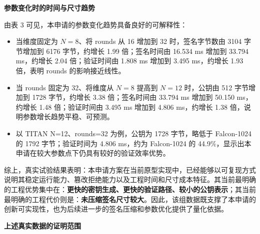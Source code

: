 \documentclass[12pt,a4paper]{article}
\begin{document}
\textbf{参数变化时的时间与尺寸趋势}

\begin{table}[htbp]
    \centering
    \small
    \caption{TITAN 参数扩展下的真实测量结果}
\end{table}

由表 3 可见，本申请的参数变化趋势具备良好的可解释性：
\begin{itemize}
    \item 当维度固定为 $N=8$、将 rounds 从 16 增加到 32 时，签名字节数由 3104 字节增加到 6176 字节，约增长 1.99 倍；签名时间由 16.534 ms 增加到 33.794 ms，约增长 2.04 倍；验证时间由 1.808 ms 增加到 3.495 ms，约增长 1.93 倍，表明 rounds 的影响接近线性。
    \item 当 rounds 固定为 32、将维度从 $N=8$ 提高到 $N=12$ 时，公钥由 512 字节增加到 1728 字节，约增长 3.38 倍；签名时间由 33.794 ms 增加到 50.150 ms，约增长 1.48 倍；验证时间由 3.495 ms 增加到 4.806 ms，约增长 1.38 倍，说明参数增长趋势平稳、可预测。
    \item 以 TITAN N=12、rounds=32 为例，公钥为 1728 字节，略低于 Falcon-1024 的 1792 字节；验证时间为 4.806 ms，约为 Falcon-1024 的 44.9\%，显示出本申请在较大参数点下仍具有较好的验证效率优势。
\end{itemize}

综上，真实试验结果表明：本申请方案在当前原型实现中，已经能够以可复现方式说明其稳定运行能力、篡改拒绝能力以及工程时间和尺寸成本特征。其当前最明确的工程优势集中在：\textbf{更快的密钥生成、更快的验证路径、较小的公钥表示}；其当前最明确的工程代价则是：\textbf{未压缩签名尺寸较大}。因此，该组数据既支撑了本申请的创新可实现性，也为后续进一步的签名压缩和参数优化提供了量化依据。

\textbf{上述真实数据的证明范围}
\end{document}

